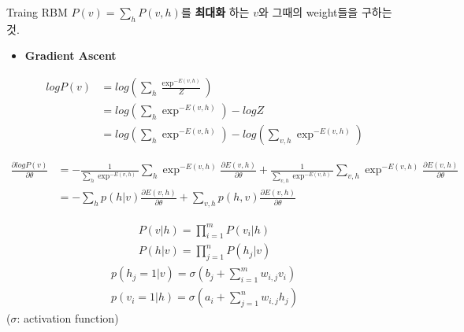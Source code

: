 \documentclass{beamer}
\begin{document}
\begin{frame}{Traing RBM}
$P(v)=\sum_h P(v,h)$를 \textbf{최대화} 하는 $v$와 그때의 weight들을 구하는 것.
\begin{itemize}
  \item \textbf{Gradient Ascent} 
\end{itemize}
\begin{subequations}
\begin{align*}
logP(v)&=log(\sum_{h} \frac{\exp^{-E(v,h)}}{Z})\\
&=log(\sum_h \exp^{-E(v,h)})-logZ\\
&=log(\sum_h \exp^{-E(v,h)})-log(\sum_{v,h} \exp^{-E(v,h)})
\end{align*}
\end{subequations}
\end{frame}

\begin{frame}\tiny
\begin{subequations}
 \label{RBMdiff}
 \begin{align*}
  \frac{\partial logP(v)}{\partial \theta}&=-\frac{1}{\sum_h \exp^{-E(v,h)}} \sum_h \exp^{-E(v,h)}\frac{\partial E(v,h)}{\partial \theta}+\frac{1}{\sum_{v,h} \exp^{-E(v,h)}} \sum_{v,h} \exp^{-E(v,h)}\frac{\partial E(v,h)}{\partial \theta} \\
  &= -\sum_{h} p(h|v) \frac{\partial E(v,h)}{\partial \theta} + \sum_{v,h} p(h,v)\frac{\partial E(v,h)}{\partial \theta} 
 \end{align*}
\end{subequations}
\end{frame}

\begin{frame}
\begin{subequations}
 \begin{align*}
  P(v|h) = \prod_{i=1}^m P(v_i|h)  \\
  P(h|v) = \prod_{j=1}^n P(h_j|v) 
 \end{align*}
\end{subequations}
\begin{subequations}
 \begin{align*}
  p(h_j=1|v) = \sigma \left(b_j + \sum_{i=1}^m w_{i,j} v_i \right)\\
  p(v_i=1|h) = \sigma \left(a_i + \sum_{j=1}^n w_{i,j} h_j \right)
 \end{align*}
\end{subequations}
($\sigma$: activation function)
\end{frame}
\end{document}
